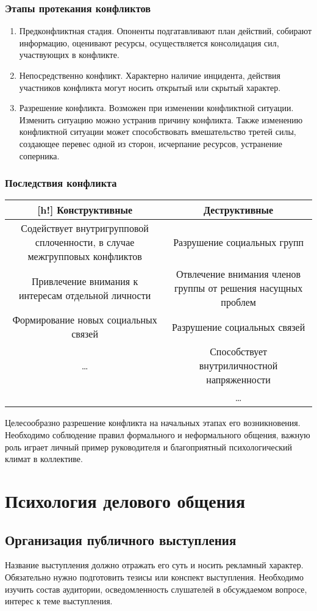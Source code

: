 \subsubsection{Этапы протекания конфликтов}
\begin{enumerate}
	\item Предконфликтная стадия. Опоненты подгатавливают план действий, собирают информацию, оценивают ресурсы, осуществляется консолидация сил, участвующих в конфликте.
	\item Непосредственно конфликт. Характерно наличие инцидента, действия участников конфликта могут носить открытый или скрытый характер.
	\item Разрешение конфликта. Возможен при изменении конфликтной ситуации. Изменить ситуацию можно устранив причину конфликта. Также изменению конфликтной ситуации может способствовать вмешательство третей силы, создающее перевес одной из сторон, исчерпание ресурсов, устранение соперника.
\end{enumerate}

\subsubsection{Последствия конфликта}
\begin{tabular}{c|c}[h!]
Конструктивные & Деструктивные\\
\hline
Содействует внутригрупповой сплоченности, в случае межгрупповых конфликтов & Разрушение социальных групп\\
Привлечение внимания к интересам отдельной личности & Отвлечение внимания членов группы от решения насущных проблем\\
Формирование новых социальных связей & Разрушение социальных связей\\
\ldots & Способствует внутриличностной напряженности\\
& \ldots \\
\hline
\end{tabular}

Целесообразно разрешение конфликта на начальных этапах его возникновения. Необходимо соблюдение правил формального и неформального общения, важную роль играет личный пример руководителя и благоприятный психологический климат в коллективе.

\section{Психология делового общения}
\subsection{Организация публичного выступления}
Название выступления должно отражать его суть и носить рекламный характер. Обязательно нужно подготовить тезисы или конспект выступления. Необходимо изучить состав аудитории, осведомленность слушателей в обсуждаемом вопросе, интерес к теме выступления.

